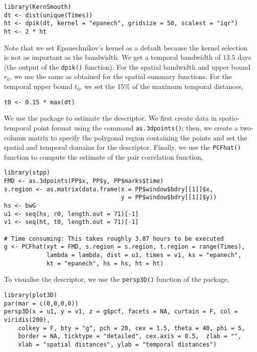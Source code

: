 \begin{verbatim}
library(KernSmooth)
dt <- dist(unique(Times))
ht <- dpik(dt, kernel = "epanech", gridsize = 50, scalest = "iqr")
ht <- 2 * ht
\end{verbatim}

Note that we set Epanechnikov's kernel as a default because the kernel selection is not as important as the bandwidth. We get a temporal bandwidth of \(13.5\) days (the output of the \texttt{dpik()} function). For the spatial bandwidth and upper bound \(r_0\), we use the same as obtained for the spatial summary functions. For the temporal upper bound \(t_0\), we set the 15\% of the maximum temporal distances,

\begin{verbatim}
t0 <- 0.15 * max(dt)
\end{verbatim}

We use the  package to estimate the descriptor. We first create data in spatio-temporal point format using the command \texttt{as.3dpoints()}; then, we create a two-column matrix to specify the polygonal region containing the points and set the spatial and temporal domains for the descriptor. Finally, we use the \texttt{PCFhat()} function to compute the estimate of the pair correlation function,

\begin{verbatim}
library(stpp)
FMD <- as.3dpoints(PP$x, PP$y, PP$marks$time)
s.region <- as.matrix(data.frame(x = PP$window$bdry[[1]]$x, 
                                 y = PP$window$bdry[[1]]$y))
hs <- bwG
u1 <- seq(hs, r0, length.out = 71)[-1]
v1 <- seq(ht, t0, length.out = 71)[-1]

# Time consuming: This takes roughly 3.87 hours to be executed
g <- PCFhat(xyt = FMD, s.region = s.region, t.region = range(Times), 
            lambda = lambda, dist = u1, times = v1, ks = "epanech", 
            kt = "epanech", hs = hs, ht = ht)
\end{verbatim}

To visualise the descriptor, we use the \texttt{persp3D()} function of the  package,

\begin{verbatim}
library(plot3D)
par(mar = c(0,0,0,0))
persp3D(x = u1, y = v1, z = g$pcf, facets = NA, curtain = F, col =  viridis(200), 
    colkey = F, bty = "g", pch = 20, cex = 1.5, theta = 40, phi = 5, 
    border = NA, ticktype = "detailed", cex.axis = 0.5,  zlab = "",
    xlab = "spatial distances", ylab = "temporal distances")
\end{verbatim}

